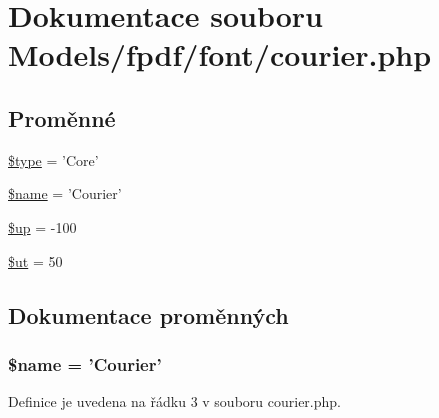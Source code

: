 \hypertarget{courier_8php}{\section{Dokumentace souboru Models/fpdf/font/courier.php}
\label{courier_8php}
}
\subsection*{Proměnné}
\begin{DoxyCompactItemize}
\item 
\hyperlink{courier_8php_a9a4a6fba2208984cabb3afacadf33919}{\$type} = 'Core'
\item 
\hyperlink{courier_8php_ab2fc40d43824ea3e1ce5d86dee0d763b}{\$name} = 'Courier'
\item 
\hyperlink{courier_8php_a6b5ad2ac55f9df46e8f34e78fbd6f176}{\$up} = -\/100
\item 
\hyperlink{courier_8php_aadd3f841051043ee58e587e840e8dd0b}{\$ut} = 50
\end{DoxyCompactItemize}


\subsection{Dokumentace proměnných}
\hypertarget{courier_8php_ab2fc40d43824ea3e1ce5d86dee0d763b}{
\subsubsection[{\$name}]{\setlength{\rightskip}{0pt plus 5cm}\$name = 'Courier'}}\label{courier_8php_ab2fc40d43824ea3e1ce5d86dee0d763b}


Definice je uvedena na řádku 3 v souboru courier.\-php.



